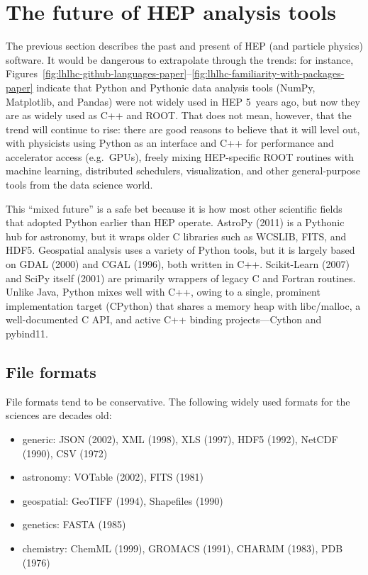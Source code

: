 \documentclass{article}
\begin{document}
\section{The future of HEP analysis tools}

The previous section describes the past and present of HEP (and particle physics) software. It would be dangerous to extrapolate through the trends: for instance, Figures~\ref{fig:lhlhc-github-languages-paper}--\ref{fig:lhlhc-familiarity-with-packages-paper} indicate that Python and Pythonic data analysis tools (NumPy, Matplotlib, and Pandas) were not widely used in HEP 5~years ago, but now they are as widely used as C++ and ROOT. That does not mean, however, that the trend will continue to rise: there are good reasons to believe that it will level out, with physicists using Python as an interface and C++ for performance and accelerator access (e.g.\ GPUs), freely mixing HEP-specific ROOT routines with machine learning, distributed schedulers, visualization, and other general-purpose tools from the data science world.

This ``mixed future'' is a safe bet because it is how most other scientific fields that adopted Python earlier than HEP operate. AstroPy (2011) is a Pythonic hub for astronomy, but it wraps older C libraries such as WCSLIB, FITS, and HDF5. Geospatial analysis uses a variety of Python tools, but it is largely based on GDAL (2000) and CGAL (1996), both written in C++. Scikit-Learn (2007) and SciPy itself (2001) are primarily wrappers of legacy C and Fortran routines. Unlike Java, Python mixes well with C++, owing to a single, prominent implementation target (CPython) that shares a memory heap with libc/malloc, a well-documented C API, and active C++ binding projects---Cython and pybind11.

\subsection{File formats}

File formats tend to be conservative. The following widely used formats for the sciences are decades old:

\begin{itemize}
\item generic: JSON (2002), XML (1998), XLS (1997), HDF5 (1992), NetCDF (1990), CSV (1972)
\item astronomy: VOTable (2002), FITS (1981)
\item geospatial: GeoTIFF (1994), Shapefiles (1990)
\item genetics: FASTA (1985)
\item chemistry: ChemML (1999), GROMACS (1991), CHARMM (1983), PDB (1976)
\end{itemize}
\end{document}
